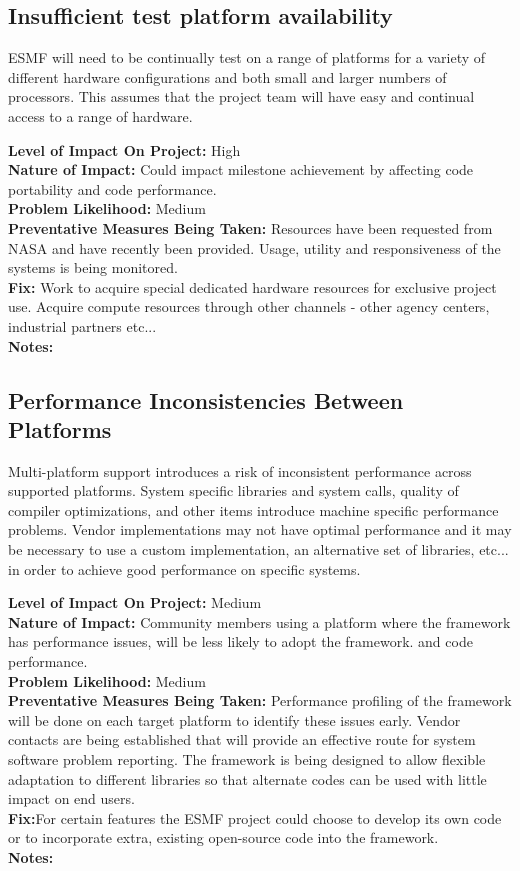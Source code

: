 \documentclass[english]{article}
\newcommand{\sreq}[1]{\subsection{\hspace{.2in}#1}}
\newenvironment
{reqlist}
{\begin{list} {} {} \rm \item[]}
{\end{list}}
\begin{document}
\sreq{Insufficient test platform availability}
ESMF will need to be continually test on a range of platforms for
a variety of different hardware configurations and both small and larger
numbers of processors. This assumes that the project team will have easy
and continual access to a range of hardware.
\begin{reqlist}
{\bf Level of Impact On Project:} High \\
{\bf Nature of Impact:} Could impact milestone achievement by affecting code portability
and code performance.\\
{\bf Problem Likelihood:} Medium \\
{\bf Preventative Measures Being Taken:}
Resources have been requested from NASA and have recently been provided.
Usage, utility and responsiveness of the systems is being monitored.
\\
{\bf Fix:} Work to acquire special dedicated hardware resources for exclusive project
use.
Acquire compute resources through other channels - other agency centers,
industrial partners etc...
\\
{\bf Notes:} 
\end{reqlist}

\sreq{Performance Inconsistencies Between Platforms}
Multi-platform support introduces a risk of inconsistent performance across supported
platforms. System specific libraries and system calls, quality of compiler optimizations, and 
other items introduce machine specific performance problems. Vendor implementations
may not have optimal performance and it may be necessary to use a custom
implementation, an alternative set of libraries, etc... in order to 
achieve good performance on specific systems.
\begin{reqlist}
{\bf Level of Impact On Project:} Medium \\
{\bf Nature of Impact:} Community members using a platform where the framework has
performance issues, will be less likely to adopt the framework.
and code performance.\\
{\bf Problem Likelihood:} Medium \\
{\bf Preventative Measures Being Taken:}
Performance profiling of the framework will be done
on each target platform to identify these issues early. Vendor contacts
are being established that will provide an effective route for 
system software problem reporting.
The framework is being designed to allow flexible adaptation to
different libraries so that alternate codes can be used with little
impact on end users.
\\
{\bf Fix:}For certain features the ESMF project could choose to develop its
own code or to incorporate extra, existing open-source code into the framework.
\\
{\bf Notes:} 
\end{reqlist}
\end{document}
